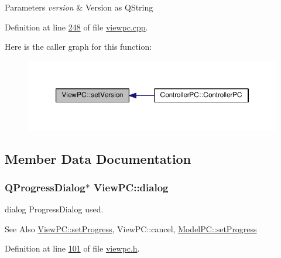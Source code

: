 \begin{DoxyParams}{Parameters}
{\em version} & Version as Q\-String \\
\hline
\end{DoxyParams}


Definition at line \hyperlink{viewpc_8cpp_source_l00248}{248} of file \hyperlink{viewpc_8cpp_source}{viewpc.\-cpp}.



Here is the caller graph for this function\-:
\nopagebreak
\begin{figure}[H]
\begin{center}
\leavevmode
\includegraphics[width=350pt]{class_view_p_c_ac05220df875b7c4f24405a5742476ebf_icgraph}
\end{center}
\end{figure}




\subsection{Member Data Documentation}
\hypertarget{class_view_p_c_a31abbb470fe329b44e6ffee202b903ca}{
\subsubsection[{dialog}]{\setlength{\rightskip}{0pt plus 5cm}Q\-Progress\-Dialog$\ast$ View\-P\-C\-::dialog}}\label{class_view_p_c_a31abbb470fe329b44e6ffee202b903ca}


dialog Progress\-Dialog used. 

\begin{DoxySeeAlso}{See Also}
\hyperlink{class_view_p_c_a9c32a1fdb6ead84e5ada8fba8860c7ed}{View\-P\-C\-::set\-Progress}, View\-P\-C\-::cancel, \hyperlink{class_model_p_c_afdcd80f0ed5062e145a71f09b0897547}{Model\-P\-C\-::set\-Progress} 
\end{DoxySeeAlso}


Definition at line \hyperlink{viewpc_8h_source_l00101}{101} of file \hyperlink{viewpc_8h_source}{viewpc.\-h}.

